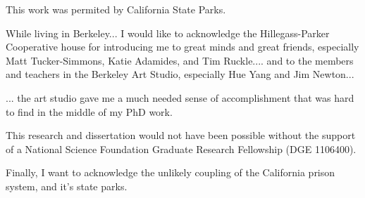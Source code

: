 This work was permited by California State Parks.

While living in Berkeley... 
I would like to acknowledge the Hillegass-Parker Cooperative house for introducing me to great minds and great friends, especially Matt Tucker-Simmons, Katie Adamides, and Tim Ruckle.... and to the members and teachers in the Berkeley Art Studio, especially Hue Yang and Jim Newton...

... the art studio gave me a much needed sense of accomplishment that was hard to find in the middle of my PhD work. 

This research and dissertation would not have been possible without the support of a National Science Foundation Graduate Research Fellowship (DGE 1106400).

Finally, I want to acknowledge the unlikely coupling of the California prison system, and it's state parks. 